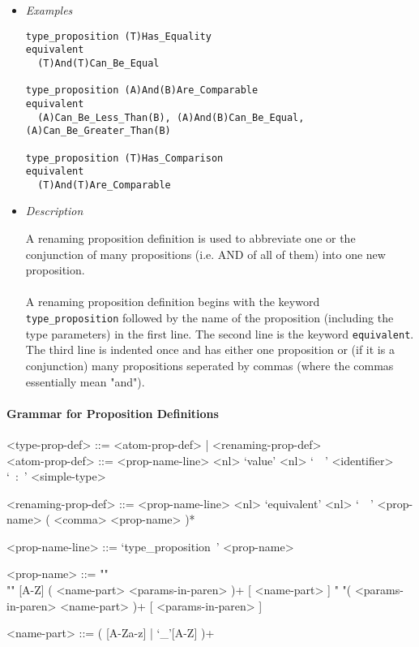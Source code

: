\documentclass{article}
\begin{document}
\begin{itemize}
\item \textit{Examples}
\begin{verbatim}
type_proposition (T)Has_Equality
equivalent
  (T)And(T)Can_Be_Equal

type_proposition (A)And(B)Are_Comparable
equivalent
  (A)Can_Be_Less_Than(B), (A)And(B)Can_Be_Equal, (A)Can_Be_Greater_Than(B)

type_proposition (T)Has_Comparison
equivalent
  (T)And(T)Are_Comparable
\end{verbatim}

\item \textit{Description}

A renaming proposition definition is used to abbreviate one or the conjunction
of many propositions (i.e. AND of all of them) into one new proposition.
\\\\
A renaming proposition definition begins with the keyword
\texttt{type_proposition} followed by the name of the proposition (including
the type parameters) in the first line. The second line is the keyword
\texttt{equivalent}. The third line is indented once and has either one
proposition or (if it is a conjunction) many propositions  seperated by commas
(where the commas essentially mean "and").

\end{itemize}

\paragraph{Grammar for Proposition Definitions}

\begin{grammar}
<type-prop-def> ::= <atom-prop-def> | <renaming-prop-def>
\\

<atom-prop-def> ::=
<prop-name-line> <nl> `value' <nl> `\ \ ' <identifier> `\ :\ ' <simple-type>

<renaming-prop-def> ::=
<prop-name-line> <nl> `equivalent' <nl> `\ \ ' <prop-name> ( <comma> <prop-name> )*

<prop-name-line> ::= `type_proposition\ ' <prop-name>

<prop-name> ::=  ""\\""
[A-Z] ( <name-part> <params-in-paren> )+ [ <name-part> ]
\alt " "( <params-in-paren> <name-part> )+ [ <params-in-paren> ]

<name-part> ::= ( [A-Za-z] | `_'[A-Z] )+
\end{grammar} 
\end{document}
